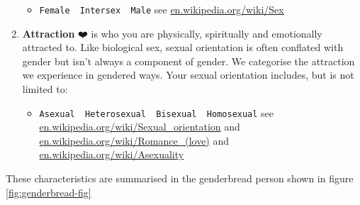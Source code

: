 \documentclass[
]{book}
\providecommand{\tightlist}{%
  \setlength{\itemsep}{0pt}\setlength{\parskip}{0pt}}
\begin{document}
\begin{enumerate}
  \begin{itemize}
  \tightlist
  \item
    \texttt{Female\ \textbar{}\ Intersex\ \textbar{}\ Male} see \href{https://en.wikipedia.org/wiki/Sex}{en.wikipedia.org/wiki/Sex}
  \end{itemize}
\item
  \textbf{Attraction} ❤️ is who you are physically, spiritually and emotionally attracted to. Like biological sex, sexual orientation is often conflated with gender but isn't always a component of gender. We categorise the attraction we experience in gendered ways. Your sexual orientation includes, but is not limited to:

  \begin{itemize}
  \tightlist
  \item
    \texttt{Asexual\ \textbar{}\ Heterosexual\ \textbar{}\ Bisexual\ \textbar{}\ Homosexual} see \href{https://en.wikipedia.org/wiki/Sexual_orientation}{en.wikipedia.org/wiki/Sexual\_orientation} and \href{https://en.wikipedia.org/wiki/Romance_(love)}{en.wikipedia.org/wiki/Romance\_(love)} and \href{https://en.wikipedia.org/wiki/Asexuality}{en.wikipedia.org/wiki/Asexuality}
  \end{itemize}
\end{enumerate}

These characteristics are summarised in the genderbread person shown in figure \ref{fig:genderbread-fig}
\end{document}
